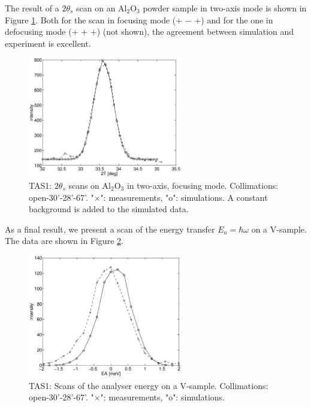 The result of a $2\theta_s$ scan on an Al$_2$O$_3$
powder sample in two-axis mode is shown in Figure \ref{f:al2o3}.
Both for the scan in focusing mode (+ $-$ +)
and for the one in defocusing mode (+ + +) (not shown),
the agreement between simulation and experiment is excellent.

\begin{figure}
  \begin{center}
    \includegraphics[width=0.6\textwidth]{figures/al2o3-focus.eps}
  \end{center}
\caption{TAS1: $2\theta_s$ scans on Al$_2$O$_3$ in two-axis, focusing mode.
Collimations: open-30'-28'-67'.
"$\times$": measurements, "o": simulations.
A constant background is added to the simulated data.}
\label{f:al2o3}
\end{figure}

As a final result, we present a scan of the energy
transfer $E_a = \hbar \omega$ on a V-sample.
The data are shown in Figure \ref{f:v_ea}.

\begin{figure}
  \begin{center}
    \includegraphics[width=0.6\textwidth]{figures/ea-scan.eps}
  \end{center}
\caption{TAS1: Scans of the analyser energy on a V-sample.
Collimations: open-30'-28'-67'.
"$\times$": measurements, "o": simulations.}
\label{f:v_ea}
\end{figure}


